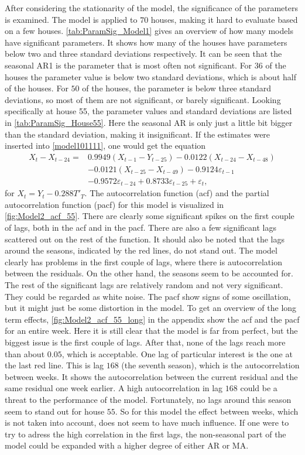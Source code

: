 \noindent After considering the stationarity of the model, the significance of the parameters is examined. The model is applied to $70$ houses, making it hard to evaluate based on a few houses. \cref{tab:ParamSig_Model1} gives an overview of how many models have significant parameters. It shows how many of the houses have parameters below two and three standard deviations respectively. It can be seen that the seasonal AR1 is the parameter that is most often not significant. For $36$ of the houses the parameter value is below two standard deviations, which is about half of the houses. For $50$ of the houses, the parameter is below three standard deviations, so most of them are not significant, or barely significant. Looking specifically at house 55, the parameter values and standard deviations are listed in \cref{tab:ParamSig_House55}. Here the seasonal AR is only just a little bit bigger than the standard deviation, making it insignificant. If the estimates were inserted into \cref{model101111}, one would get the equation
\begin{align}
    X_t-X_{t-24} =& 0.9949 (X_{t-1}-Y_{t-25}) - 0.0122 (X_{t-24}-X_{t-48}) \nonumber\\  & - 0.0121  (X_{t-25}-X_{t-49}) - 0.9124 \varepsilon_{t-1} \nonumber\\
    &-0.9572 \varepsilon_{t-24} + 0.8733 \varepsilon_{t-25} + \varepsilon_t,
\end{align}
for $X_t = Y_t - 0.288 T'_T$. The autocorrelation function (acf) and the partial autocorrelation function (pacf) for this model is visualized in \cref{fig:Model2_acf_55}. There are clearly some significant spikes on the first couple of lags, both in the acf and in the pacf. There are also a few significant lags scattered out on the rest of the function. It should also be noted that the lags around the seasons, indicated by the red lines, do not stand out. The model clearly has problems in the first couple of lags, where there is autocorrelation between the residuals. On the other hand, the seasons seem to be accounted for. The rest of the significant lags are relatively random and not very significant. They could be regarded as white noise. The pacf show signs of some oscillation, but it might just be some distortion in the model. To get an overview of the long term effects, \cref{fig:Model2_acf_55_long} in the appendix show the acf and the pacf for an entire week. Here it is still clear that the model is far from perfect, but the biggest issue is the first couple of lags. After that, none of the lags reach more than about $0.05$, which is acceptable. One lag of particular interest is the one at the last red line. This is lag $168$ (the seventh season), which is the autocorrelation between weeks. It shows the autocorrelation between the current residual and the same residual one week earlier. A high autocorrelation in lag $168$ could be a threat to the performance of the model. Fortunately, no lags around this season seem to stand out for house $55$. So for this model the effect between weeks, which is not taken into account, does not seem to have much influence. If one were to try to adress the high correlation in the first lags, the non-seasonal part of the model could be expanded with a higher degree of either AR or MA.


